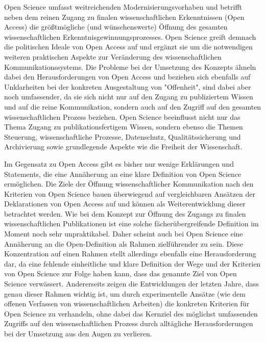 Open Science umfasst weitreichenden Modernisierungsvorhaben und betrifft neben dem reinen Zugang zu finalen wissenschaftlichen Erkenntnissen (Open Access) die größtmögliche (und wünschenswerte) Öffnung des gesamten wissenschaftlichen Erkenntnisgewinnungsprozesses. Open Science greift demnach die politischen Ideale von Open Access auf und ergänzt sie um die notwendigen weiteren praktischen Aspekte zur Veränderung des wissenschaftlichen Kommunikationssystems. Die Probleme bei der Umsetzung des Konzepts ähneln dabei den Herausforderungen von Open Access und beziehen sich ebenfalls auf Unklarheiten bei der konkreten Ausgestaltung von "Offenheit", sind dabei aber noch umfassender, da sie sich nicht nur auf den Zugang zu publiziertem Wissen und auf die reine Kommunikation, sondern auch auf den Zugriff auf den gesamten wissenschaftlichen Prozess beziehen. Open Science beeinflusst nicht nur das Thema Zugang zu publikationsfertigem Wissen, sondern ebenso die Themen Steuerung, wissenschaftliche Prozesse, Datenschutz, Qualitätssicherung und Archivierung sowie grundlegende Aspekte wie die Freiheit der Wissenschaft.

Im Gegensatz zu Open Access gibt es bisher nur wenige Erklärungen und Statements, die eine Annäherung an eine klare Definition von Open Science ermöglichen. Die Ziele der Öffnung wissenschaftlicher Kommunikation nach den Kriterien von Open Science bauen überwiegend auf vergleichbaren Ansätzen der Deklarationen von Open Access auf und können als Weiterentwicklung dieser betrachtet werden. Wie bei dem Konzept zur Öffnung des Zugangs zu finalen wissenschaftlichen Publikationen ist eine solche fächerübergreifende Definition im Moment noch sehr unpraktikabel. Daher scheint auch bei Open Science eine Annäherung an die Open-Definition als Rahmen zielführender zu sein. Diese Konzentration auf einen Rahmen stellt allerdings ebenfalls eine Herausforderung dar, da eine fehlende einheitliche und klare Definition der Wege und der Kriterien von Open Science zur Folge haben kann, dass das genannte Ziel von Open Science verwässert. Andererseits zeigen die Entwicklungen der letzten Jahre, dass genau dieser Rahmen wichtig ist, um durch experimentelle Ansätze (wie dem offenen Verfassen von wissenschaftlichen Arbeiten) die konkreten Kriterien für Open Science zu verhandeln, ohne dabei das Kernziel des möglichst umfassenden Zugriffs auf den wissenschaftlichen Prozess durch alltägliche Herausforderungen bei der Umsetzung aus den Augen zu verlieren.

